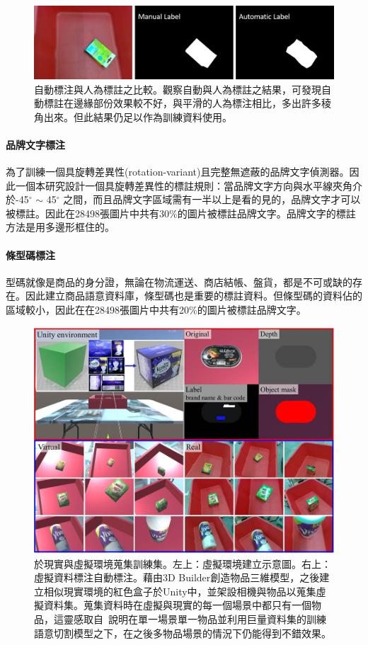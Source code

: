 \begin{figure}[ht]
	\centering
	\includegraphics[height=!, width=1.0\linewidth, keepaspectratio=true]
	{./figures/auto_object_label.png}
  \caption{自動標注與人為標註之比較。觀察自動與人為標註之結果，可發現自動標註在邊緣部份效果較不好，與平滑的人為標注相比，多出許多稜角出來。但此結果仍足以作為訓練資料使用。}
  \label{figure:auto_object_label}
\end{figure}


\paragraph{品牌文字標注}
為了訓練一個具旋轉差異性(rotation-variant)且完整無遮蔽的品牌文字偵測器。因此一個本研究設計一個具旋轉差異性的標註規則：當品牌文字方向與水平線夾角介於-45$^{\circ}$ $\sim$ 45$^{\circ}$ 之間，而且品牌文字區域需有一半以上是看的見的，品牌文字才可以被標註。因此在28498張圖片中共有30\%的圖片被標註品牌文字。品牌文字的標註方法是用多邊形框住的。

\paragraph{條型碼標注}
型碼就像是商品的身分證，無論在物流運送、商店結帳、盤貨，都是不可或缺的存在。因此建立商品語意資料庫，條型碼也是重要的標註資料。但條型碼的資料佔的區域較小，因此在在28498張圖片中共有20\%的圖片被標註品牌文字。


\begin{figure}[ht]
	\centering
	\includegraphics[height=!, width=0.8\linewidth, keepaspectratio=true]
	{./figures/real_and_vir_environment.jpg}
  \caption{於現實與虛擬環境蒐集訓練集。左上：虛擬環境建立示意圖。右上：虛擬資料標注自動標注。藉由3D Builder創造物品三維模型，之後建立相似現實環境的紅色盒子於Unity中，並架設相機與物品以蒐集虛擬資料集。蒐集資料時在虛擬與現實的每一個場景中都只有一個物品，這靈感取自~\cite{}說明在單一場景單一物品並利用巨量資料集的訓練語意切割模型之下，在之後多物品場景的情況下仍能得到不錯效果。}
  \label{figure:benchmark-dataset}
\end{figure}



